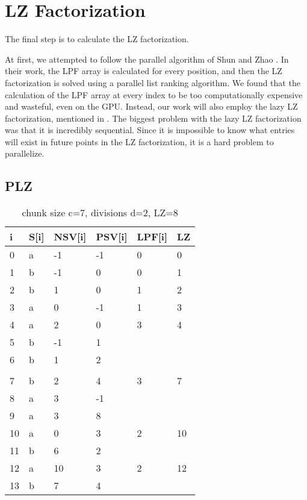 \section{LZ Factorization}

The final step is to calculate the LZ factorization.

At first, we attempted to follow the parallel algorithm of Shun and Zhao \cite{shun2013practical}.
In their work, the LPF array is calculated for every position, and then the LZ factorization is solved using a parallel list ranking algorithm.
We found that the calculation of the LPF array at every index to be too computationally expensive and wasteful, even on the GPU.
Instead, our work will also employ the lazy LZ factorization, mentioned in \cite{karkkainen2013linear}.
The biggest problem with the lazy LZ factorization was that it is incredibly sequential.
Since it is impossible to know what entries will exist in future points in the LZ factorization, it is a hard problem to parallelize.

\subsection{PLZ}

\begin{table}[h]
\centering
\begin{tabular}{@{}llllll@{}}
\toprule
i  & S{[}i{]} & NSV{[}i{]} & PSV{[}i{]} & LPF{[}i{]} & LZ \\ \midrule
0  & a        & -1         & -1         & 0          & 0  \\
1  & b        & -1         & 0          & 0          & 1  \\
2  & b        & 1          & 0          & 1          & 2  \\
3  & a        & 0          & -1         & 1          & 3  \\
4  & a        & 2          & 0          & 3          & 4  \\
5  & b        & -1         & 1          &            &    \\
6  & b        & 1          & 2          &            &    \\
   &          &            &            &            &    \\
7  & b        & 2          & 4          & 3          & 7  \\
8  & a        & 3          & -1         &            &    \\
9  & a        & 3          & 8          &            &    \\
10 & a        & 0          & 3          & 2          & 10 \\
11 & b        & 6          & 2          &            &    \\
12 & a        & 10         & 3          & 2          & 12 \\
13 & b        & 7          & 4          &            &    \\ \bottomrule
\end{tabular}
\caption{chunk size c=7, divisions d=2, LZ=8}
\label{tab:example7}
\end{table}

